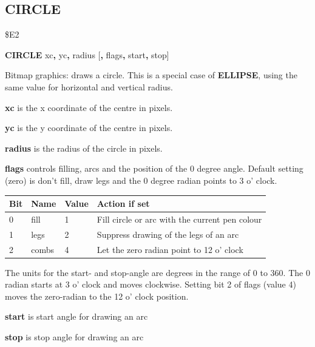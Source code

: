 \subsection{CIRCLE}
\begin{description}[leftmargin=2cm,style=nextline]
\item [Token:]   \$E2

\item [Format:]  {\bf CIRCLE} xc{\bf,} yc{\bf,} radius [{\bf,} flags{\bf,} start{\bf,} stop]

\item [Usage:]   Bitmap graphics: draws a circle. This is a special case of {\bf ELLIPSE}, using the same value for horizontal and vertical radius.

                 {\bf xc} is the x coordinate of the centre in pixels.

                 {\bf yc} is the y coordinate of the centre in pixels.

                 {\bf radius} is the radius of the circle in pixels.

                 {\bf flags} controls filling, arcs and the position of the 0 degree angle. Default setting (zero) is don't fill, draw legs and the 0 degree radian points to 3 o' clock.

                 {\setlength{\tabcolsep}{1.5mm}
                 \begin{tabular}{|l|l|l|l|}
                 \hline
                 {\bf Bit}  & {\bf Name} & {\bf Value} & {\bf Action if set} \\
                 \hline
                 0 & fill  & 1  & Fill circle or arc with the current pen colour \\
                 1 & legs  & 2  & Suppress drawing of the legs of an arc \\
                 2 & combs & 4  & Let the zero radian point to 12 o' clock \\
                 \hline
                 \end{tabular}
                 }

                 The units for the start- and stop-angle are degrees in the range of 0 to 360. The 0 radian starts at 3 o' clock and moves clockwise. Setting bit 2 of flags (value 4) moves the zero-radian to the 12 o' clock position.

                 {\bf start} is start angle for drawing an arc

                 {\bf stop} is stop angle for drawing an arc


\end{description}
